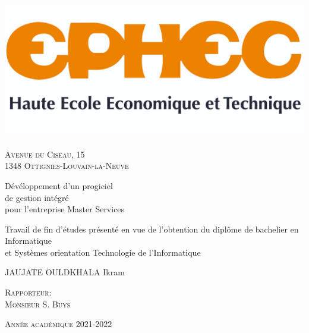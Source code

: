 \documentclass[french, 11pt, a4paper]{article}
\begin{document}
\singlespacing


\begin{titlepage}
\begin{center}

\includegraphics[width=15cm]{img/ephec.jpg}~\\
\textsc{Avenue du Ciseau, 15 \\ 1348 Ottignies-Louvain-la-Neuve} \\[1.5cm]

{\huge \bfseries \begin{spacing}{1.25}
  Dévéloppement d'un progiciel \\ 
  de gestion intégré \\
  pour l'entreprise Master Services
  \\[2cm]
  \end{spacing} 
} 

{\large 
  Travail de fin d’études présenté en vue de l’obtention du diplôme de bachelier en Informatique \\ 
  et Systèmes orientation Technologie de l’Informatique
  \\[2cm]
}

{\LARGE 
JAUJATE OULDKHALA Ikram
}

\vspace*{\fill}
  
\end{center}

\begin{minipage}[t]{.5\textwidth}
  \textsc{\large Rapporteur:\\Monsieur S. Buys}
\end{minipage}
\begin{minipage}[br]{.5\textwidth}
  \textsc{\large Année académique 2021-2022}
\end{minipage}  

\end{titlepage}
\end{document}
